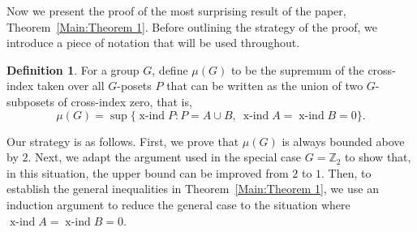 \documentclass[preprint,12pt]{article}
\theoremstyle{definition}
\newtheorem{definition}[theorem]{Definition}
\theoremstyle{remark}
\numberwithin{equation}{section}
\DeclareMathOperator{\xind}{x-ind}
\begin{document}
Now we present the proof of the most surprising result of the paper, Theorem~\ref{Main:Theorem 1}. Before outlining the strategy of the proof, we introduce a piece of notation that will be used throughout.

\begin{definition}
For a group \(G\), define \(\mu(G)\) to be the supremum of the cross-index taken over all \(G\)-posets \(P\) that can be written as the union of two \(G\)-subposets of cross-index zero, that is,
\[
\mu(G) = \sup\{\xind P : P = A \cup B,\ \xind A = \xind B = 0\}.
\]
\end{definition}

Our strategy is as follows. First, we prove that \(\mu(G)\) is always bounded above by \(2\). Next, we adapt the argument used in the special case \(G = \mathbb{Z}_2\) to show that, in this situation, the upper bound can be improved from \(2\) to \(1\). Then, to establish the general inequalities in Theorem~\ref{Main:Theorem 1}, we use an induction argument to reduce the general case to the situation where \(\xind A=\xind B=0\).
\end{document}
